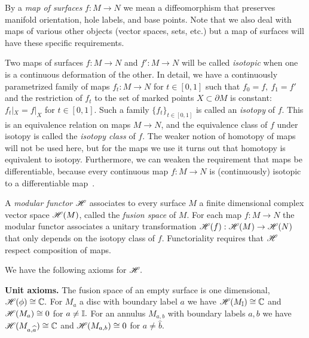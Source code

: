 By a \emph{map of surfaces} $f:M\to N$ we mean 
a diffeomorphism that preserves
manifold orientation, hole labels, and base points.
Note that we also deal with maps of various other objects
(vector spaces, sets, etc.)
but a map of surfaces will have these specific
requirements.

Two maps of surfaces $f:M\to N$ and $f':M\to N$
will be called \emph{isotopic}
when one is a continuous deformation of the other.
In detail,
we have a continuously
parametrized family of maps $f_t:M\to N$ for $t\in [0, 1]$
such that $f_0=f,\ f_1=f'$
and the restriction of $f_t$ to the 
set of marked points $X\subset\partial M$ is constant:
$f_t|_{X} = f|_{X}$ for $t\in [0, 1].$
Such a family $\{f_t\}_{t\in [0,1]}$ is called an \emph{isotopy}
of $f.$
This is an equivalence relation on maps $M\to N$, and the equivalence
class of $f$ under isotopy is called the \emph{isotopy class} of $f.$
The weaker notion of homotopy of maps will not be used
here, but for the maps we use
it turns out that homotopy is equivalent to isotopy.
Furthermore, we can weaken the requirement that maps be differentiable,
because every continuous map $f:M\to N$ is (continuously)
isotopic to a differentiable map~\cite{Farb2011}.

A \emph{modular functor} $\mathscr{H}$ associates to every
surface $M$ a finite dimensional complex
vector space $\mathscr{H}(M)$, called the \emph{fusion space} of $M$.
For each map $f:M\to N$
the modular functor associates a
unitary transformation $\mathscr{H}(f) : \mathscr{H}(M)\to\mathscr{H}(N)$
that only depends on the isotopy class of $f.$
Functoriality requires that $\mathscr{H}$
respect composition of maps.

We have the following axioms for $\mathscr{H}.$

{\bf Unit axioms.}
The fusion space of an empty surface is one dimensional, 
$\mathscr{H}(\phi) \cong \mathbb{C}.$ %
For $M_a$ a disc with boundary label $a$ we have
$\mathscr{H}(M_{\mathbb{I}})\cong \mathbb{C}$ and 
$\mathscr{H}(M_a)\cong 0$ for $a\ne \mathbb{I}.$
For an annulus $M_{a,b}$ with boundary labels
$a, b$ we have
$\mathscr{H}(M_{a,\widehat{a}})\cong \mathbb{C}$ and 
$\mathscr{H}(M_{a,b})\cong 0$ for $a\ne \widehat{b}.$

